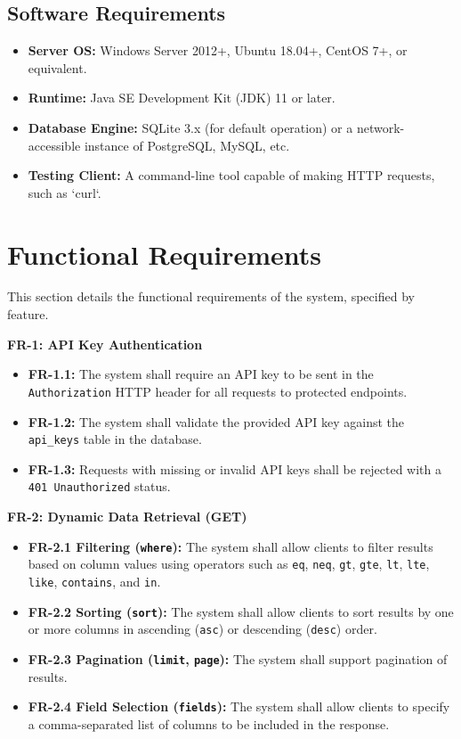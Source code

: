 \documentclass[12pt, a4paper]{report}
\begin{document}
\subsection{Software Requirements}
\begin{itemize}
    \item \textbf{Server OS:} Windows Server 2012+, Ubuntu 18.04+, CentOS 7+, or equivalent.
    \item \textbf{Runtime:} Java SE Development Kit (JDK) 11 or later.
    \item \textbf{Database Engine:} SQLite 3.x (for default operation) or a network-accessible instance of PostgreSQL, MySQL, etc.
    \item \textbf{Testing Client:} A command-line tool capable of making HTTP requests, such as `curl`.
\end{itemize}

\section{Functional Requirements}
This section details the functional requirements of the system, specified by feature.

\noindent %
\textbf{FR-1: API Key Authentication}
\begin{itemize}
    \item \textbf{FR-1.1:} The system shall require an API key to be sent in the \lstinline|Authorization| HTTP header for all requests to protected endpoints.
    \item \textbf{FR-1.2:} The system shall validate the provided API key against the \lstinline|api_keys| table in the database.
    \item \textbf{FR-1.3:} Requests with missing or invalid API keys shall be rejected with a \lstinline|401 Unauthorized| status.
\end{itemize}

\noindent\textbf{FR-2: Dynamic Data Retrieval (GET)}
\begin{itemize}
    \item \textbf{FR-2.1 Filtering (\lstinline|where|):} The system shall allow clients to filter results based on column values using operators such as \lstinline|eq|, \lstinline|neq|, \lstinline|gt|, \lstinline|gte|, \lstinline|lt|, \lstinline|lte|, \lstinline|like|, \lstinline|contains|, and \lstinline|in|.
    \item \textbf{FR-2.2 Sorting (\lstinline|sort|):} The system shall allow clients to sort results by one or more columns in ascending (\lstinline|asc|) or descending (\lstinline|desc|) order.
    \item \textbf{FR-2.3 Pagination (\lstinline|limit|, \lstinline|page|):} The system shall support pagination of results.
    \item \textbf{FR-2.4 Field Selection (\lstinline|fields|):} The system shall allow clients to specify a comma-separated list of columns to be included in the response.
\end{itemize}
\end{document}
